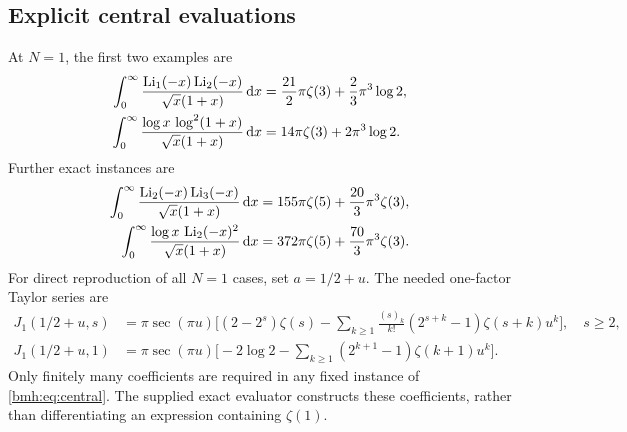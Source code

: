\subsection{Explicit central evaluations}
At $N=1$, the first two examples are
\begin{align}
 \int_0^\infty\frac{\operatorname{Li}_1(-x)\operatorname{Li}_2(-x)}{\sqrt{x}(1+x)}\,\mathrm d x
 &=\frac{21}{2}\pi\zeta(3)+\frac23\pi^3\log2,
 \label{bmh:eq:central12}\\
 \int_0^\infty\frac{\log x\,\log^2(1+x)}{\sqrt{x}(1+x)}\,\mathrm d x
 &=14\pi\zeta(3)+2\pi^3\log2.
 \label{bmh:eq:central11log}
\end{align}
Further exact instances are
\begin{align}
 \int_0^\infty\frac{\operatorname{Li}_2(-x)\operatorname{Li}_3(-x)}{\sqrt{x}(1+x)}\,\mathrm d x
 &=155\pi\zeta(5)+\frac{20}{3}\pi^3\zeta(3),
 \label{bmh:eq:central23}\\
 \int_0^\infty\frac{\log x\,\operatorname{Li}_2(-x)^2}{\sqrt{x}(1+x)}\,\mathrm d x
 &=372\pi\zeta(5)+\frac{70}{3}\pi^3\zeta(3).
 \label{bmh:eq:central22log}
\end{align}
For direct reproduction of all $N=1$ cases, set $a=1/2+u$. The needed
one-factor Taylor series are
\begin{align}
 J_1(1/2+u,s)&=\pi\sec(\pi u)\biggl[
 (2-2^s)\zeta(s)
 -\sum_{k\ge1}\frac{(s)_k}{k!}(2^{s+k}-1)\zeta(s+k)u^k
 \biggr],\quad s\ge2,\label{bmh:eq:central-J}\\
 J_1(1/2+u,1)&=\pi\sec(\pi u)\biggl[
 -2\log2-\sum_{k\ge1}(2^{k+1}-1)\zeta(k+1)u^k
 \biggr].\label{bmh:eq:central-J1}
\end{align}
Only finitely many coefficients are required in any fixed instance of
\eqref{bmh:eq:central}. The supplied exact evaluator constructs these
coefficients, rather than differentiating an expression containing
$\zeta(1)$.
